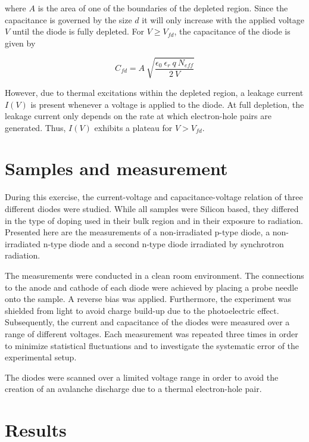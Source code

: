 \documentclass[11pt,a4paper]{report}
\begin{document}
where $A$ is the area of one of the boundaries of the depleted region. Since the capacitance is governed by the size $d$ it will only increase with the applied voltage $V$ until the diode is fully depleted. For $V \geq V_{fd}$, the capacitance of the diode is given by

\begin{equation}
  \label{eq:1}
   C_{fd} = A ~ \sqrt{\frac{\epsilon_0 ~ \epsilon_r ~q ~ N_{eff}}{2 ~ V}}
\end{equation}

However, due to thermal excitations within the depleted region, a leakage current $I(V)$ is present whenever a voltage is applied to the diode.
At full depletion, the leakage current only depends on the rate at which electron-hole pairs are generated. Thus, $I(V)$ exhibits a plateau for $V>V_{fd}$.


\section*{Samples and measurement}
\label{sec:samples}

During this exercise, the current-voltage and capacitance-voltage relation of three different diodes were studied. While all samples were Silicon based, they differed in the type of doping used in their bulk region and in their exposure to radiation.
Presented here are the measurements of a non-irradiated p-type diode, a non-irradiated n-type diode and a second n-type diode irradiated by synchrotron radiation. 

The measurements were conducted in a clean room environment. The connections to the anode and cathode of each diode were achieved by placing a probe needle onto the sample.
A reverse bias was applied.
Furthermore, the experiment was shielded from light to avoid charge build-up due to the photoelectric effect. Subsequently, the current and capacitance of the diodes were measured over a range of different voltages. Each measurement was repeated three times in order to minimize statistical fluctuations and to investigate the systematic error of the experimental setup.

The diodes were scanned over a limited voltage range in order to avoid the creation of an avalanche discharge due to a thermal electron-hole pair.


\section*{Results}
\end{document}
